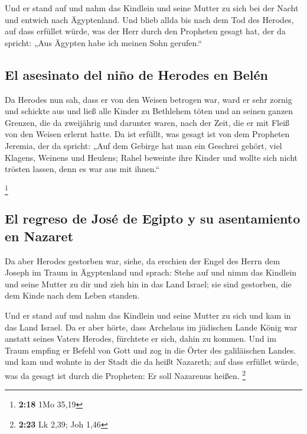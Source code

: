  Und er stand auf und nahm das Kindlein und seine Mutter
zu sich bei der Nacht und entwich nach Ägyptenland.  Und
blieb allda bis nach dem Tod des Herodes, auf dass erfüllet würde, was
der Herr durch den Propheten gesagt hat, der da spricht: „Aus Ägypten
habe ich meinen Sohn gerufen.``

\hypertarget{el-asesinato-del-niuxf1o-de-herodes-en-beluxe9n}{%
\subsection{El asesinato del niño de Herodes en
Belén}\label{el-asesinato-del-niuxf1o-de-herodes-en-beluxe9n}}

 Da Herodes nun sah, dass er von den Weisen betrogen war,
ward er sehr zornig und schickte aus und ließ alle Kinder zu Bethlehem
töten und an seinen ganzen Grenzen, die da zweijährig und darunter
waren, nach der Zeit, die er mit Fleiß von den Weisen erlernt hatte.
 Da ist erfüllt, was gesagt ist von dem Propheten
Jeremia, der da spricht:  „Auf dem Gebirge hat man ein
Geschrei gehört, viel Klagens, Weinens und Heulens; Rahel beweinte ihre
Kinder und wollte sich nicht trösten lassen, denn es war aus mit
ihnen.``

\footnote{\textbf{2:18} 1Mo 35,19}

\hypertarget{el-regreso-de-josuxe9-de-egipto-y-su-asentamiento-en-nazaret}{%
\subsection{El regreso de José de Egipto y su asentamiento en
Nazaret}\label{el-regreso-de-josuxe9-de-egipto-y-su-asentamiento-en-nazaret}}

 Da aber Herodes gestorben war, siehe, da erschien der
Engel des Herrn dem Joseph im Traum in Ägyptenland  und
sprach: Stehe auf und nimm das Kindlein und seine Mutter zu dir und zieh
hin in das Land Israel; sie sind gestorben, die dem Kinde nach dem Leben
standen.

 Und er stand auf und nahm das Kindlein und seine Mutter
zu sich und kam in das Land Israel.  Da er aber hörte,
dass Archelaus im jüdischen Lande König war anstatt seines Vaters
Herodes, fürchtete er sich, dahin zu kommen. Und im Traum empfing er
Befehl von Gott und zog in die Örter des galiläischen Landes.
 und kam und wohnte in der Stadt die da heißt Nazareth;
auf dass erfüllet würde, was da gesagt ist durch die Propheten: Er soll
Nazarenus heißen. \footnote{\textbf{2:23} Lk 2,39; Joh 1,46}

